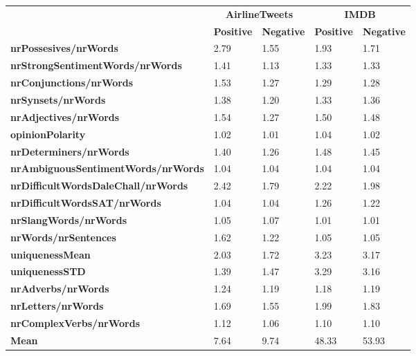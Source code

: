 \begin{tabular}{|l|l|l|l|l|} \cline{2-5}
\multicolumn{1}{c|}{} & \multicolumn{2}{c|}{\textbf{AirlineTweets}} & \multicolumn{2}{c|}{\textbf{IMDB}}\\ \cline{2-5}
\multicolumn{1}{c|}{} & \textbf{Positive} & \textbf{Negative} & \textbf{Positive} & \textbf{Negative} \\ \hline
\textbf{{\scriptsize nrPossesives/nrWords}} & 2.79 & 1.55 & 1.93 & 1.71 \\ \hline
\textbf{{\scriptsize nrStrongSentimentWords/nrWords}} & 1.41 & 1.13 & 1.33 & 1.33 \\ \hline
\textbf{{\scriptsize nrConjunctions/nrWords}} & 1.53 & 1.27 & 1.29 & 1.28 \\ \hline
\textbf{{\scriptsize nrSynsets/nrWords}} & 1.38 & 1.20 & 1.33 & 1.36 \\ \hline
\textbf{{\scriptsize nrAdjectives/nrWords}} & 1.54 & 1.27 & 1.50 & 1.48 \\ \hline
\textbf{{\scriptsize opinionPolarity}} & 1.02 & 1.01 & 1.04 & 1.02 \\ \hline
\textbf{{\scriptsize nrDeterminers/nrWords}} & 1.40 & 1.26 & 1.48 & 1.45 \\ \hline
\textbf{{\scriptsize nrAmbiguousSentimentWords/nrWords}} & 1.04 & 1.04 & 1.04 & 1.04 \\ \hline
\textbf{{\scriptsize nrDifficultWordsDaleChall/nrWords}} & 2.42 & 1.79 & 2.22 & 1.98 \\ \hline
\textbf{{\scriptsize nrDifficultWordsSAT/nrWords}} & 1.04 & 1.04 & 1.26 & 1.22 \\ \hline
\textbf{{\scriptsize nrSlangWords/nrWords}} & 1.05 & 1.07 & 1.01 & 1.01 \\ \hline
\textbf{{\scriptsize nrWords/nrSentences}} & 1.62 & 1.22 & 1.05 & 1.05 \\ \hline
\textbf{{\scriptsize uniquenessMean}} & 2.03 & 1.72 & 3.23 & 3.17 \\ \hline
\textbf{{\scriptsize uniquenessSTD}} & 1.39 & 1.47 & 3.29 & 3.16 \\ \hline
\textbf{{\scriptsize nrAdverbs/nrWords}} & 1.24 & 1.19 & 1.18 & 1.19 \\ \hline
\textbf{{\scriptsize nrLetters/nrWords}} & 1.69 & 1.55 & 1.99 & 1.83 \\ \hline
\textbf{{\scriptsize nrComplexVerbs/nrWords}} & 1.12 & 1.06 & 1.10 & 1.10 \\ \Xhline{3\arrayrulewidth}
\textbf{{\scriptsize Mean}} & 7.64 & 9.74 & 48.33 & 53.93 \\ \hline
\end{tabular}